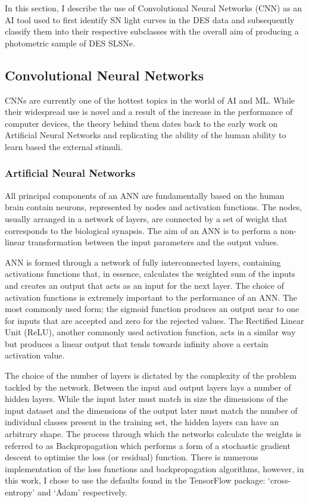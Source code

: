 In this section, I describe the use of Convolutional Neural Networks (CNN) as an AI tool used to first identify SN light curves in the DES data and subsequently classify them into their respective subclasses with the overall aim of producing a photometric sample of DES SLSNe.

\subsection{Convolutional Neural Networks} \label{sec:CNN}
CNNs are currently one of the hottest topics in the world of AI and ML. While their widespread use is novel and a result of the increase in the performance of computer devices, the theory behind them dates back to the early work on Artificial Neural Networks \citep[ANN;][]{Mcculloch1943} and replicating the ability of the human ability to learn based the external stimuli.

\subsubsection{Artificial Neural Networks}
All principal components of an ANN are fundamentally based on the human brain contain neurons, represented by nodes and activation functions. The nodes, usually arranged in a network of layers, are connected by a set of weight that corresponds to the biological synapsis. The aim of an ANN is to perform a non-linear transformation between the input parameters and the output values.

ANN is formed through a network of fully interconnected layers, containing activations functions that, in essence, calculates the weighted sum of the inputs and creates an output that acts as an input for the next layer. The choice of activation functions is extremely important to the performance of an ANN. The most commonly used form; the sigmoid function produces an output near to one for inputs that are accepted and zero for the rejected values. The Rectified Linear Unit (ReLU), another commonly used activation function, acts in a similar way but produces a linear output that tends towards infinity above a certain activation value.

The choice of the number of layers is dictated by the complexity of the problem tackled by the network. Between the input and output layers lays a number of hidden layers. While the input later must match in size the dimensions of the input dataset and the dimensions of the output later must match the number of individual classes present in the training set, the hidden layers can have an arbitrary shape. The process through which the networks calculate the weights is referred to as Backpropagation which performs a form of a stochastic gradient descent to optimise the loss (or residual) function. There is numerous implementation of the loss functions and backpropagation algorithms, however, in this work, I chose to use the defaults found in the TensorFlow package: `cross-entropy' and `Adam' respectively.

